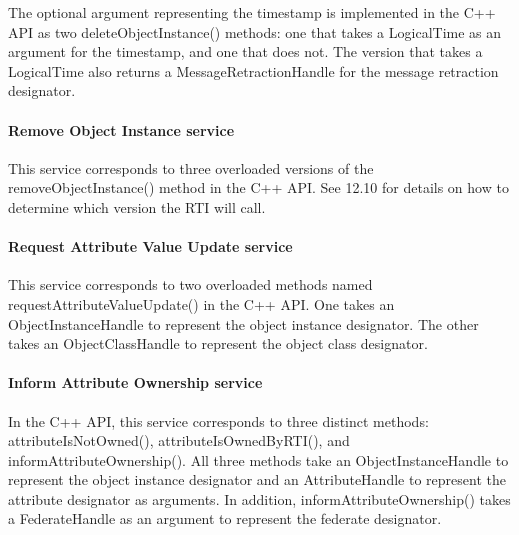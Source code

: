 \begin{compactstdpage}
    The optional argument representing the timestamp is implemented in the C++ API as two deleteObjectInstance() methods: one that takes a LogicalTime as an argument for the timestamp, and one that does not. The version that takes a LogicalTime also returns a MessageRetractionHandle for the message retraction designator.

    \paragraph{Remove Object Instance \rtiinitiated{} service}

    This service corresponds to three overloaded versions of the removeObjectInstance() method in the C++ API. See 12.10 for details on how to determine which version the RTI will call.

    \paragraph{Request Attribute Value Update service}

    This service corresponds to two overloaded methods named requestAttributeValueUpdate() in the C++ API. One takes an ObjectInstanceHandle to represent the object instance designator. The other takes an ObjectClassHandle to represent the object class designator.

    \paragraph{Inform Attribute Ownership \rtiinitiated{} service}

    In the C++ API, this service corresponds to three distinct methods: attributeIsNotOwned(), attributeIsOwnedByRTI(), and informAttributeOwnership(). All three methods take an ObjectInstanceHandle to represent the object instance designator and an AttributeHandle to represent the attribute designator as arguments. In addition, informAttributeOwnership() takes a FederateHandle as an argument to represent the federate designator.

\end{compactstdpage}

\clearpage

